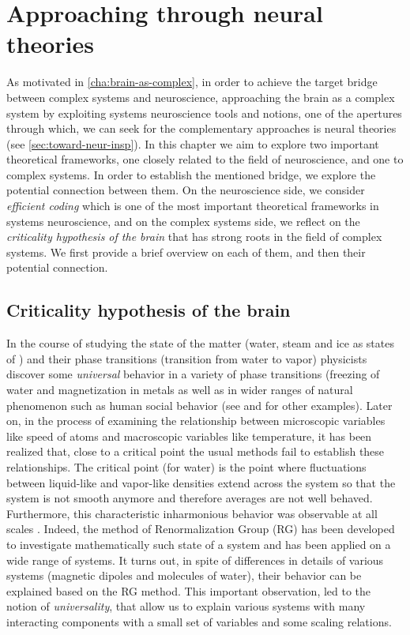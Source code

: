 \chapter{Approaching through neural theories}\label{cha:appr-thro-theo}

As motivated in \autoref{cha:brain-as-complex},
in order to achieve the target bridge between complex systems and neuroscience, \ie
approaching the brain as a complex system by exploiting systems neuroscience tools and notions,
one of the apertures through which, we can seek for the complementary approaches is neural theories (see  \autoref{sec:toward-neur-insp}).
In this chapter we aim to explore two important theoretical frameworks,
one closely related to the field of neuroscience, and one to complex systems.
In order to establish the mentioned bridge, we explore the potential connection between them.
On the neuroscience side, we consider \emph{efficient coding} which is one of the most important theoretical frameworks in systems neuroscience,
and on the complex systems side, we reflect on the \emph{criticality hypothesis of the brain} that has strong roots in the field of complex systems.
We first provide a brief overview on each of them, and then their potential connection.


\section{Criticality hypothesis of the brain}\label{sec:crit-hypoth-brain}
In the course of studying the state of the matter
(\eg water, steam and ice as states of )
and their phase transitions (\eg transition from water to vapor)
physicists discover some \emph{universal} behavior in a variety of phase transitions
(\eg freezing of water and  magnetization in metals \cite[Chapter 5]{schroederIntroductionThermalPhysics1999}
as well as in wider ranges of natural phenomenon such as human social behavior \cite{castellanoNonequilibriumPhaseTransition2000} 
(see \citet{mathisEmergenceLifeFirstOrder2017} and \citet{bar-yamWhyComplexityDifferent2017} for other examples).
Later on, in the process of examining the relationship between microscopic variables like speed of atoms and macroscopic variables like temperature,
it has been realized that, close to a critical point the usual methods fail to establish these relationships.
The critical point (for water) is the point where fluctuations between liquid-like and
vapor-like densities extend across the system so that the system is not smooth anymore and therefore averages are not well behaved.
Furthermore, this characteristic inharmonious behavior was observable at all scales \cite{bar-yamWhyComplexityDifferent2017}.
Indeed, the method of Renormalization Group (RG) has been developed to investigate mathematically such state of a system and has been applied on a wide range of systems.
It turns out, in spite of differences in details of various systems (\eg magnetic dipoles and molecules of water),
their behavior can be explained based on the RG method.
This important observation, led to the notion of \emph{universality},
that allow us to explain various systems with many interacting components with a small set of variables and some scaling relations.

